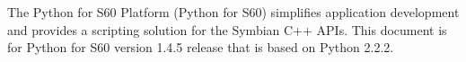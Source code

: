 
The Python for S60 Platform (Python for S60) simplifies application development 
and provides a scripting solution for the Symbian C++ APIs. This document is for 
Python for S60 version 1.4.5 release that is based on Python 2.2.2.
